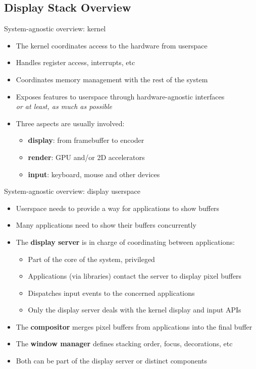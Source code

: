 \subsection{Display Stack Overview}

\begin{frame}{System-agnostic overview: kernel}
  \begin{itemize}
  \item The kernel coordinates access to the hardware from userspace
  \item Handles register access, interrupts, etc
  \item Coordinates memory management with the rest of the system
  \item Exposes features to userspace through hardware-agnostic interfaces\\
  \textit{or at least, as much as possible}
  \item Three aspects are usually involved:
    \begin{itemize}
    \item \textbf{display}: from framebuffer to encoder
    \item \textbf{render}: GPU and/or 2D accelerators
    \item \textbf{input}: keyboard, mouse and other devices
    \end{itemize}
  \end{itemize}
\end{frame}

\begin{frame}{System-agnostic overview: display userspace}
  \begin{itemize}
  \item Userspace needs to provide a way for applications to show buffers
  \item Many applications need to show their buffers concurrently
  \item The \textbf{display server} is in charge of coordinating between applications:
    \begin{itemize}
    \item Part of the core of the system, privileged
    \item Applications (via libraries) contact the server to display pixel buffers
    \item Dispatches input events to the concerned applications
    \item Only the display server deals with the kernel display and input APIs
    \end{itemize}
  \item The \textbf{compositor} merges pixel buffers from applications into the final buffer
  \item The \textbf{window manager} defines stacking order, focus, decorations, etc
  \item Both can be part of the display server or distinct components
  \end{itemize}
\end{frame}

